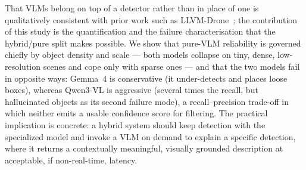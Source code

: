\documentclass[acmtog, authorversion]{acmart}
\begin{document}
That VLMs belong on top of a detector rather than in place of one is
qualitatively consistent with prior work such as
LLVM-Drone~\cite{hu2025llvmdrone}; the contribution of this study is the
quantification and the failure characterisation that the hybrid/pure
split makes possible. We show that pure-VLM reliability is governed
chiefly by object density and scale --- both models collapse on
tiny, dense, low-resolution scenes and cope only with sparse ones ---
and that the two models fail in opposite ways: Gemma~4 is conservative
(it under-detects and places loose boxes), whereas Qwen3-VL is
aggressive (several times the recall, but hallucinated objects as its
second failure mode), a recall--precision trade-off in which neither
emits a usable confidence score for filtering. The practical
implication is concrete: a hybrid system should keep detection with the
specialized model and invoke a VLM on demand to explain a specific
detection, where it returns a contextually meaningful, visually grounded
description at acceptable, if non-real-time, latency.
\end{document}

